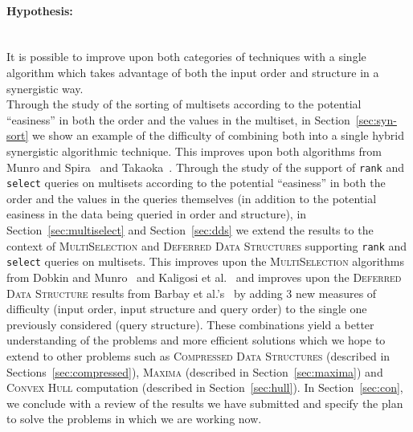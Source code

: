 
\paragraph{Hypothesis:}~\\ It is possible to improve upon both
categories of techniques with a single algorithm which takes advantage
of both the input order and structure in a synergistic way.~\\


Through the study of the sorting of multisets according to the
potential ``easiness'' in both the order and the values in the
multiset, in Section~\ref{sec:syn-sort} we show an example of the
difficulty of combining both into a single hybrid synergistic algorithmic
technique. 
This improves upon both algorithms from Munro and
Spira~\cite{1976-JComp-SortingAndSearchingInMultisets-MunroSpira} and
Takaoka~\cite{2009-Chapter-PartialSolutionAndEntropy-Takaoka}.
%
Through the study of the support of \texttt{rank} and \texttt{select}
queries on multisets according to the potential ``easiness'' in both
the order and the values in the queries themselves (in addition to the
potential easiness in the data being queried in order and structure),
in Section~\ref{sec:multiselect} and Section~\ref{sec:dds} we extend
the results to the context of \textsc{MultiSelection} and
\textsc{Deferred Data Structures} supporting \texttt{rank} and
\texttt{select} queries on multisets. This improves upon the
\textsc{MultiSelection} algorithms from Dobkin and
Munro~\cite{1981-JACM-OptimalTimeMinimalSpaceSelectionAlgorithms-DobkinMunro}
and Kaligosi et
al.~\cite{2005-ICALP-TowardsOptimalMultopleSelection-KaligosiMehlhornMunroSanders}
and improves upon the \textsc{Deferred Data Structure} results from
Barbay et
al.'s~\cite{2016-JDA-NearOptimalOnlineMultiselectionInInternalAndExternalMemory-BarbayGuptaRaoSorenson}
by adding 3 new measures of difficulty (input order, input structure
and query order) to the single one previously considered (query
structure). These combinations yield a better understanding of the
problems and more efficient solutions which we hope to extend to other
problems such as \textsc{Compressed Data Structures} (described in
Sections~\ref{sec:compressed}), \textsc{Maxima} (described in
Section~\ref{sec:maxima}) and \textsc{Convex Hull} computation
(described in Section~\ref{sec:hull}). In Section~\ref{sec:con}, we
conclude with a review of the results we have submitted and specify
the plan to solve the problems in which we are working now.

